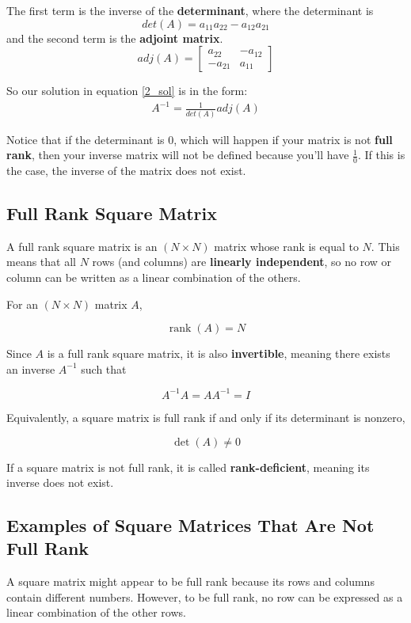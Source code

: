 \documentclass[12pt]{article}
\begin{document}
The first term is the inverse of the \textbf{determinant}, where the determinant is \[det(A) = a_{11} a_{22} - a_{12} a_{21}\] and the second term is the \textbf{adjoint matrix}. 
\[adj(A) = \begin{bmatrix}
        a_{22} & -a_{12}\\
        -a_{21} & a_{11}
    \end{bmatrix}\]

So our solution in equation \ref{2_sol} is in the form: \\
\begin{align}
    A^{-1} = \frac{1}{det(A)} adj(A) \label{og_def}
\end{align}


Notice that if the determinant is 0, which will happen if your matrix is not \textbf{full rank}, then your inverse matrix will not be defined because you'll have $\frac{1}{0}.$ If this is the case, the inverse of the matrix does not exist.\\

\subsection{Full Rank Square Matrix}

A full rank square matrix is an $(N \times N)$ matrix whose rank is equal to $N$. This means that all $N$ rows (and columns) are \textbf{linearly independent}, so no row or column can be written as a linear combination of the others.

For an $(N \times N)$ matrix $A$,

\[
{\operatorname{rank}(A) = N}
\]

Since $A$ is a full rank square matrix, it is also \textbf{invertible}, meaning there exists an inverse $A^{-1}$ such that

\[
A^{-1}A = AA^{-1} = I
\]

Equivalently, a square matrix is full rank if and only if its determinant is nonzero,

\[
\det(A) \neq 0
\]

If a square matrix is not full rank, it is called \textbf{rank-deficient}, meaning its inverse does not exist.

\subsection{Examples of Square Matrices That Are Not Full Rank}

A square matrix might appear to be full rank because its rows and columns contain different numbers. However, to be full rank, no row can be expressed as a linear combination of the other rows.
\end{document}
